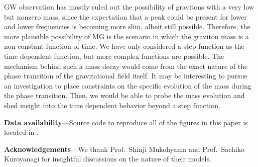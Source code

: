 \documentclass[prd,twocolumn,aps,psfig,nofootinbib,nobibnotes,superscriptaddress,preprintnumbers,times]{revtex4-2}
\begin{document}
GW observation has mostly ruled out the possibility of gravitons with a very low but nonzero mass, since the expectation that a peak could be present for lower and lower frequencies is becoming more slim, albeit still possible. Therefore, the more plausible possibility of MG is the scenario in which the graviton mass is a non-constant function of time. We have only considered a step function as the time dependent function, but more complex functions are possible. The mechanism behind such a mass decay would come from the exact nature of the phase transition of the gravitational field itself. It may be interesting to pursue an investigation to place constraints on the specific evolution of the mass during the phase transition. Then, we would be able to probe the mass evolution and shed insight into the time dependent behavior beyond a step function.

\vspace{2mm}
{\bf Data availability}---Source code to reproduce all of the figures in this paper is located in \cite{GH}. 
\vspace{2mm}

{\bf Acknowledgements}---We thank Prof.\ Shinji Mukohyama and Prof.\ Sachiko Kuroyanagi for insightful discussions on the nature of their models.





\clearpage
\end{document}
